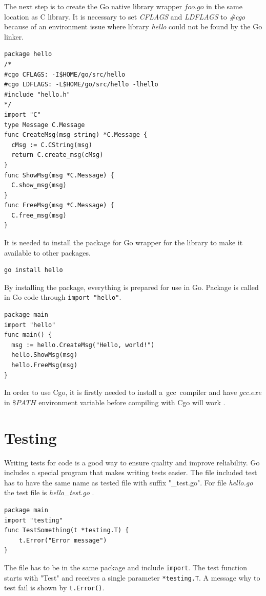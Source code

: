 \documentclass[
  oneside, 12pt, 
  printed, %
  notable,   %
  nolof,     %
  nolot,     %
]{fithesis3}
\begin{document}
The next step is to create the Go native library wrapper $foo.go$ in the same location as C library. It is necessary to set \textit{CFLAGS} and \textit{LDFLAGS} to \textit{\#cgo} because of an environment issue where library \textit{hello} could not be found by the Go linker.
\begin{lstlisting}
package hello
/*
#cgo CFLAGS: -I$HOME/go/src/hello
#cgo LDFLAGS: -L$HOME/go/src/hello -lhello
#include "hello.h"
*/
import "C"
type Message C.Message
func CreateMsg(msg string) *C.Message {
  cMsg := C.CString(msg)
  return C.create_msg(cMsg)
}
func ShowMsg(msg *C.Message) {
  C.show_msg(msg)
}
func FreeMsg(msg *C.Message) {
  C.free_msg(msg)
}
\end{lstlisting}
It is needed to install the package for Go wrapper for the library to make it available to other packages. 
\begin{lstlisting} 
go install hello
\end{lstlisting}
By installing the package, everything is prepared for use in Go. Package is called in Go code 
through \texttt{import "hello"}.
\begin{lstlisting}
package main
import "hello"
func main() {
  msg := hello.CreateMsg("Hello, world!")
  hello.ShowMsg(msg)
  hello.FreeMsg(msg)
}
\end{lstlisting}

In order to use Cgo, it is firstly needed to install a~gcc~compiler and have $gcc.exe$ in $\$PATH$ 
environment variable before compiling with Cgo will work \cite{bloggolangorg,cgo-wiki}.

\section{Testing}

Writing tests for code is a good way to ensure quality and improve reliability. Go includes a special program that makes writing tests easier. The file included test has to have the same name as tested file with suffix "\_test.go". For file \textit{hello.go} the test file is \textit{hello\_test.go} \cite{chisnall2012go,testblog}.
\begin{lstlisting}
package main
import "testing"
func TestSomething(t *testing.T) {
	t.Error("Error message")
}
\end{lstlisting}
The file has to be in the same package and include \texttt{import}. The test function starts with "Test" and receives a single parameter \texttt{*testing.T}. A message why to test fail is shown by \texttt{t.Error()}. 
\end{document}
